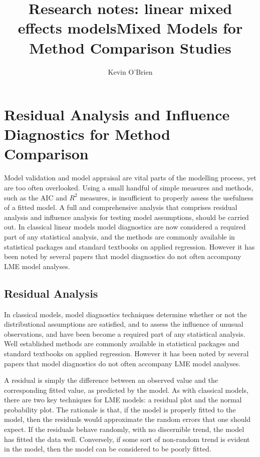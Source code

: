 \documentclass[12pt, a4paper]{report}
\title{Research notes: linear mixed effects models}
\author{ } \date{ }
\theoremstyle{plain}
\theoremstyle{definition}
\theoremstyle{remark}
\begin{document}
	\author{Kevin O'Brien}
	\title{Mixed Models for Method Comparison Studies}
	
	
	
	
	
	\chapter{Residual Analysis and Influence Diagnostics for Method Comparison}
	Model validation and model appraisal are vital parts of the modelling process, yet are too often overlooked.	Using a small handful of simple measures and methods, such as the AIC and $R^2$ measures, is insufficient to properly assess the usefulness of a fitted model. A full and comprehensive
	analysis that comprises residual analysis and influence analysis for testing model assumptions, should be carried out.  In classical linear models model diagnostics are now considered a required part of any statistical analysis, and the methods are commonly available in statistical packages and standard textbooks on applied regression. However it has been noted by several papers \citep{Christensen, schabenberger} that model diagnostics do not often accompany LME model analyses.

\section{Residual Analysis}
In classical models, model diagnostics techniques determine whether or not the distributional assumptions are satisfied, and to assess the influence of unusual observations, and have been become a required part of any statistical analysis. Well established methods are commonly available in statistical packages and standard textbooks on applied regression. However it has been noted by several papers that model diagnostics do not often accompany LME model analyses. 
	
A residual is simply the difference between an observed value and the corresponding fitted value, as predicted by the model. As with classical models, there are two key techniques for LME models: a residual plot and the normal probability plot. The rationale is that, if the model is properly fitted to the model, then the residuals would approximate the random errors that one should expect.
If the residuals behave randomly, with no discernible trend, the model has fitted the data well. Conversely, if some sort of non-random trend is evident in the model, then the model can be considered to be poorly fitted. 
\end{document}
